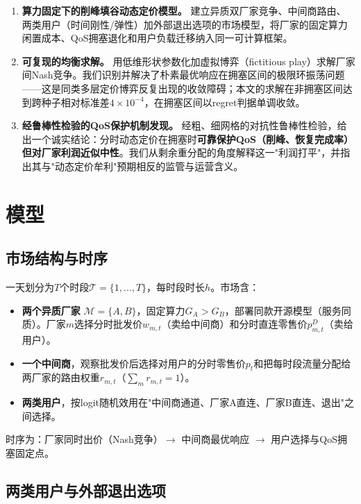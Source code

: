 \documentclass[UTF8,11pt]{ctexart}
\newcommand{\T}{\mathcal{T}}
\newcommand{\M}{\mathcal{M}}
\begin{document}
\begin{enumerate}[leftmargin=2em]
  \item \textbf{算力固定下的削峰填谷动态定价模型。} 建立异质双厂家竞争、中间商路由、两类用户（时间刚性/弹性）加外部退出选项的市场模型，将厂家的固定算力闲置成本、QoS拥塞退化和用户负载迁移纳入同一可计算框架。
  \item \textbf{可复现的均衡求解。} 用低维形状参数化加虚拟博弈（fictitious play）求解厂家间Nash竞争。我们识别并解决了朴素最优响应在拥塞区间的极限环振荡问题——这是同类多层定价博弈反复出现的收敛障碍；本文的求解在非拥塞区间达到跨种子相对标准差$4\times10^{-4}$，在拥塞区间以regret判据单调收敛。
  \item \textbf{经鲁棒性检验的QoS保护机制发现。} 经粗、细网格的对抗性鲁棒性检验，给出一个诚实结论：分时动态定价在拥塞时\textbf{可靠保护QoS（削峰、恢复完成率）但对厂家利润近似中性}。我们从剩余重分配的角度解释这一"利润打平"，并指出其与"动态定价牟利"预期相反的监管与运营含义。
\end{enumerate}

\section{模型}
\label{sec:model}

\subsection{市场结构与时序}

一天划分为$T$个时段$\T=\{1,\ldots,T\}$，每时段时长$h$。市场含：
\begin{itemize}[leftmargin=2em]
  \item \textbf{两个异质厂家} $\M=\{A,B\}$，固定算力$G_A>G_B$，部署同款开源模型（服务同质）。厂家$m$选择分时批发价$w_{m,t}$（卖给中间商）和分时直连零售价$p^D_{m,t}$（卖给用户）。
  \item \textbf{一个中间商}，观察批发价后选择对用户的分时零售价$p_t$和把每时段流量分配给两厂家的路由权重$r_{m,t}$（$\sum_m r_{m,t}=1$）。
  \item \textbf{两类用户}，按logit随机效用在"中间商通道、厂家A直连、厂家B直连、退出"之间选择。
\end{itemize}
时序为：厂家同时出价（Nash竞争）$\to$ 中间商最优响应 $\to$ 用户选择与QoS拥塞固定点。

\subsection{两类用户与外部退出选项}
\end{document}
